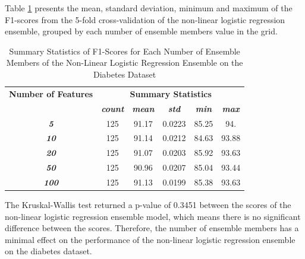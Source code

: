 \documentclass[10pt, conference]{IEEEtran}
\begin{document}
Table \ref{table: D_member_nonlinear_performance_metrics} presents the mean, standard deviation, minimum and maximum of the
F1-scores from the 5-fold cross-validation of the non-linear logistic regression ensemble, grouped by each number of ensemble members
value in the grid.
\begin{table}[H]
    \caption{Summary Statistics of F1-Scores for Each Number of Ensemble Members of the Non-Linear Logistic Regression Ensemble on the Diabetes Dataset}
    \begin{center}
        \begin{tabular}{|c||c|c|c|c|c|}
            \hline
            \textbf{Number of Features}&\multicolumn{5}{|c|}{\textbf{Summary Statistics}} \\
            \cline{2-6}
                                &\textbf{\textit{count}} & \textbf{\textit{mean}} & \textbf{\textit{std}} & \textbf{\textit{min}} & \textbf{\textit{max}}\\
            \hline
            \textbf{\textit{5}}   & 125 & 91.17 & 0.0223 & 85.25 & 94. \\
            \textbf{\textit{10}}  & 125 & 91.14 & 0.0212 & 84.63 & 93.88 \\
            \textbf{\textit{20}}  & 125 & 91.07 & 0.0203 & 85.92 & 93.63 \\
            \textbf{\textit{50}}  & 125 & 90.96 & 0.0207 & 85.04 & 93.44 \\
            \textbf{\textit{100}} & 125 & 91.13 & 0.0199 & 85.38 & 93.63 \\
            \hline
        \end{tabular}
    \end{center}
    \label{table: D_member_nonlinear_performance_metrics}
\end{table}
The Kruskal-Wallis test returned a p-value of 0.3451 between the scores of the non-linear logistic regression ensemble model,
which means there is no significant difference between the scores. Therefore, the number of ensemble members
has a minimal effect on the performance of the non-linear logistic regression ensemble on the diabetes dataset.
\end{document}
